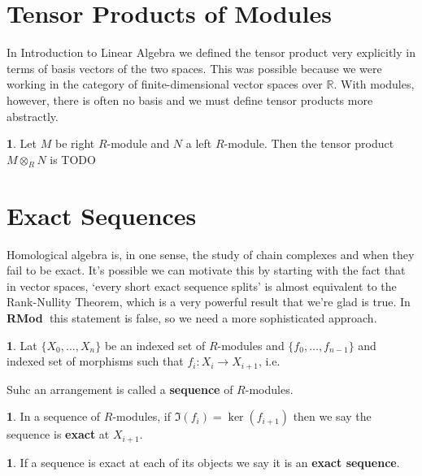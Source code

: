 \documentclass[oneside,english]{amsbook}
\numberwithin{section}{chapter}
\theoremstyle{plain}
\theoremstyle{definition}
\newtheorem{defn}[thm]{\protect\definitionname}
\providecommand{\definitionname}{Definition}
\newcommand{\catname}[1]{{\normalfont\textbf{#1}}}
\newcommand{\RMod}{\catname{RMod\ }}
\begin{document}
	\section{Tensor Products of Modules}

		In Introduction to Linear Algebra we defined the tensor product very explicitly in terms of basis vectors of the two spaces. This was possible because we were working in the category of finite-dimensional vector spaces over $\mathbb{R}$. With modules, however, there is often no basis and we must define tensor products more abstractly.
		
		\begin{defn}
			Let $M$ be right $R$-module and $N$ a left $R$-module. Then the tensor product $M\otimes_R N$ is TODO
		\end{defn}

	\section{Exact Sequences}
	
		Homological algebra is, in one sense, the study of chain complexes and when they fail to be exact. It's possible we can motivate this by starting with the fact that in vector spaces, `every short exact sequence splits' is almost equivalent to the Rank-Nullity Theorem, which is a very powerful result that we're glad is true. In \RMod this statement is false, so we need a more sophisticated approach.
		
		\begin{defn}
			Lat $\{X_0,\ldots,X_n\}$ be an indexed set of $R$-modules and $\{f_0,\ldots,f_{n-1}\}$ and indexed set of morphisms such that $f_i:X_i\to X_{i+1}$, i.e. 
			\begin{center}
			\end{center}					
			Suhc an arrangement is called a \textbf{sequence} of $R$-modules.
		\end{defn}
		
		\begin{defn}
			In a sequence of $R$-modules, if $\Im(f_i) = \ker(f_{i+1})$ then we say the sequence is \textbf{exact} at $X_{i+1}$.
		\end{defn}

		\begin{defn}
			If a sequence is exact at each of its objects we say it is an \textbf{exact sequence}.
		\end{defn}
		
\end{document}

